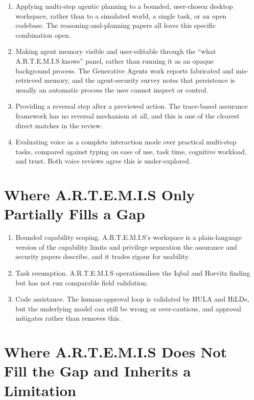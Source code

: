 \documentclass[11pt,a4paper]{report}
\newcommand{\artemis}{A.R.T.E.M.I.S}
\begin{document}
\begin{enumerate}
  \item Applying multi-step agentic planning to a bounded, user-chosen
        desktop workspace, rather than to a simulated world, a single
        task, or an open codebase. The reasoning-and-planning papers
        all leave this specific combination open.
  \item Making agent memory visible and user-editable through the
        \enquote{what \artemis{} knows} panel, rather than running it as
        an opaque background process. The Generative Agents work reports
        fabricated and mis-retrieved memory, and the agent-security
        survey notes that persistence is usually an automatic process
        the user cannot inspect or control.
  \item Providing a reversal step after a previewed action. The
        trace-based assurance framework has no reversal mechanism at
        all, and this is one of the clearest direct matches in the
        review.
  \item Evaluating voice as a complete interaction mode over practical
        multi-step tasks, compared against typing on ease of use, task
        time, cognitive workload, and trust. Both voice reviews agree
        this is under-explored.
\end{enumerate}

\section{Where \artemis{} Only Partially Fills a Gap}

\begin{enumerate}
  \item Bounded capability scoping. \artemis{}'s workspace is a
        plain-language version of the capability limits and privilege
        separation the assurance and security papers describe, and it
        trades rigour for usability.
  \item Task resumption. \artemis{} operationalises the Iqbal and
        Horvitz finding but has not run comparable field validation.
  \item Code assistance. The human-approval loop is validated by HULA
        and HiLDe, but the underlying model can still be wrong or
        over-cautious, and approval mitigates rather than removes this.
\end{enumerate}

\section{Where \artemis{} Does Not Fill the Gap and Inherits a
Limitation}
\end{document}
